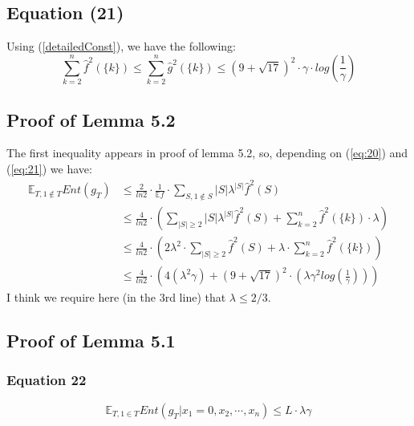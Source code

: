 \documentclass{article}
\begin{document}
		\subsection{Equation (21)}
			Using (\ref{detailedConst}), we have the following:
			\begin{equation} \label{eq:21}
				\sum_{k=2}^n \hat{f}^2 \left( \{k\} \right) 
				\leq \sum_{k=2}^n \hat{g}^2 \left( \{k\} \right) 
				\leq \left( 9 + \sqrt{17} \right) ^ 2 \cdot \gamma \cdot log \left( \frac{1}{\gamma} \right)
			\end{equation}
	
		\subsection{Proof of Lemma 5.2}
			The first inequality appears in proof of lemma 5.2, so, depending on (\ref{eq:20}) and (\ref{eq:21}) we have:
			\begin{equation} \label{lemma5:2}\begin{aligned}
				\mathbb{E}_{T, 1 \notin T} Ent(g_T)
				& \leq \frac{2}{ln2} \cdot \frac{1}{\mathbb{E} f} \cdot \sum_{S, 1 \notin S} |S| \lambda^{|S|} \hat{f}^2(S) \\
				& \leq \frac{4}{ln2} \cdot \left( \sum_{|S| \geq 2} |S| \lambda^{|S|} \hat{f}^2(S) + \sum_{k=2}^n \hat{f}^2 \left( \{k\} \right) \cdot \lambda \right) \\
				& \leq \frac{4}{ln2}  \cdot \left( 2 \lambda^2 \cdot \sum_{|S| \geq 2} \hat{f}^2(S) + \lambda \cdot \sum_{k=2}^n \hat{f}^2 \left( \{k\} \right) \right) \\
				& \leq \frac{4}{ln2} \cdot \left( 4 ( \lambda^2 \gamma ) + \left( 9 + \sqrt{17} \right)^2 \cdot \left( \lambda \gamma^2 log \left( \frac{1}{\gamma} \right) \right) \right)
			\end{aligned}
			\end{equation}
			I think we require here (in the 3rd line) that $\lambda \leq 2/3$.

		\subsection{Proof of Lemma 5.1}
			\subsubsection{Equation 22}
				\begin{equation}
					\mathbb{E}_{T,1 \in T} Ent \left( g_T | x_1 = 0,x_2, \cdots, x_n \right) \leq L \cdot \lambda \gamma
			\end{equation}
            
\end{document}
